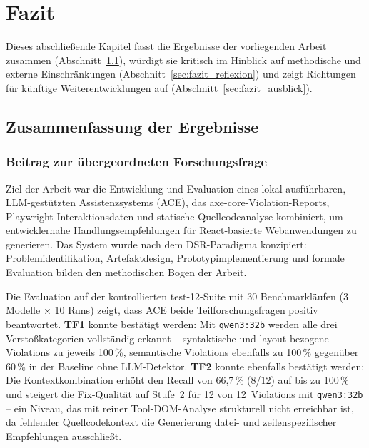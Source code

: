 \chapter{Fazit} \label{kap:8}

Dieses abschließende Kapitel fasst die Ergebnisse der vorliegenden Arbeit zusammen (Abschnitt~\ref{sec:fazit_zusammenfassung}), würdigt sie kritisch im Hinblick auf methodische und externe Einschränkungen (Abschnitt~\ref{sec:fazit_reflexion}) und zeigt Richtungen für künftige Weiterentwicklungen auf (Abschnitt~\ref{sec:fazit_ausblick}).

\section{Zusammenfassung der Ergebnisse}
\label{sec:fazit_zusammenfassung}

\subsection{Beitrag zur übergeordneten Forschungsfrage}
\label{sec:fazit_ff}

Ziel der Arbeit war die Entwicklung und Evaluation eines lokal ausführbaren, \ac{LLM}-gestützten Assistenzsystems (\ac{ACE}), das axe-core-Violation-Reports, Playwright-Interaktionsdaten und statische Quellcodeanalyse kombiniert, um entwicklernahe Handlungsempfehlungen für React-basierte Webanwendungen zu generieren. Das System wurde nach dem \ac{DSR}-Paradigma konzipiert: Problemidentifikation, Artefaktdesign, Prototypimplementierung und formale Evaluation bilden den methodischen Bogen der Arbeit.

Die Evaluation auf der kontrollierten test-12-Suite mit 30 Benchmarkläufen (3 Modelle $\times$ 10 Runs) zeigt, dass \ac{ACE} beide Teilforschungsfragen positiv beantwortet. \textbf{TF1} konnte bestätigt werden: Mit \texttt{qwen3:32b} werden alle drei Verstoßkategorien vollständig erkannt -- syntaktische und layout-bezogene Violations zu jeweils 100\,\%, semantische Violations ebenfalls zu 100\,\% gegenüber 60\,\% in der Baseline ohne \ac{LLM}-Detektor. \textbf{TF2} konnte ebenfalls bestätigt werden: Die Kontextkombination erhöht den Recall von 66,7\,\% (8/12) auf bis zu 100\,\% und steigert die Fix-Qualität auf Stufe~2 für 12 von 12~Violations mit \texttt{qwen3:32b} -- ein Niveau, das mit reiner Tool-DOM-Analyse strukturell nicht erreichbar ist, da fehlender Quellcodekontext die Generierung datei- und zeilenspezifischer Empfehlungen ausschließt.

